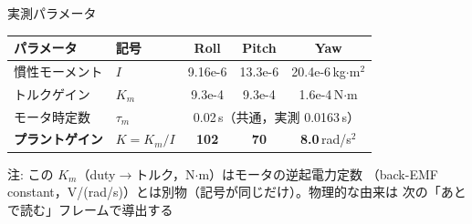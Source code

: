 \begin{frame}{実測パラメータ}
  \begin{table}
    \centering\footnotesize
    \begin{tabular}{llccc}
      \hline
      \textbf{パラメータ} & \textbf{記号} & \textbf{Roll} & \textbf{Pitch} & \textbf{Yaw} \\
      \hline
      慣性モーメント & $I$ & 9.16e-6 & 13.3e-6 & 20.4e-6\,kg$\cdot$m$^2$ \\
      トルクゲイン   & $K_m$ & 9.3e-4 & 9.3e-4 & 1.6e-4\,N$\cdot$m \\
      モータ時定数   & $\tau_m$ & \multicolumn{3}{c}{0.02\,s（共通，実測 0.0163\,s）} \\
      \hline
      \textbf{プラントゲイン} & $K = K_m/I$ & \textbf{102} & \textbf{70} & \textbf{8.0}\,rad/s$^2$ \\
      \hline
    \end{tabular}
  \end{table}

  \vspace{0.3em}

  {\footnotesize 注: この $K_m$（duty$\to$トルク，N$\cdot$m）はモータの逆起電力定数
  （back-EMF constant，V/(rad/s)）とは別物（記号が同じだけ）。物理的な由来は
  次の「あとで読む」フレームで導出する}
\end{frame}

